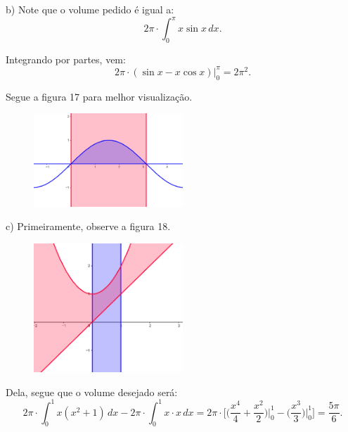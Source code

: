 \documentclass{article}
\begin{document}
{\begin{newpage}
b) Note que o volume pedido é igual a:
\begin{equation*}\displaystyle{2\pi\cdot\int_{0}^{\pi } x\sin{x}\, dx.}\end{equation*}
\par Integrando por partes, vem:
\begin{equation*}\displaystyle{2\pi\cdot (\sin{x} - x\cos{x})\Big|_{0}^{\pi } = 2\pi^{2}.}\end{equation*}
\par Segue a figura 17 para melhor visualização.
\begin{figure}[htbp]
\begin{center}
\includegraphics[width=0.5\textwidth, angle=0]{Grafico22.png}
\end{center}
\caption{}  
\end{figure}
\par
\vspace{1cm}
c) Primeiramente, observe a figura 18.
\begin{figure}[htbp]
\begin{center}
\includegraphics[width=0.5\textwidth, angle=0]{Grafico23.png}
\end{center}
\caption{}  
\end{figure}
\par Dela, segue que o volume desejado será:
\begin{equation*}\displaystyle{2\pi\cdot\int_{0}^{1}x(x^{2} + 1)\, dx - 2\pi\cdot\int_{0}^{1} x\cdot x\, dx = 2\pi\cdot\Big[ \Big(\frac{x^4}{4} + \frac{x^2}{2}\Big)\Big|^{1}_{0} - \Big(\frac{x^3}{3}\Big)\Big|^{1}_{0}    \Big] = \frac{5\pi }{6}.}\end{equation*}
\par
\vspace{0.3cm}

\end{newpage}}
\end{document}
